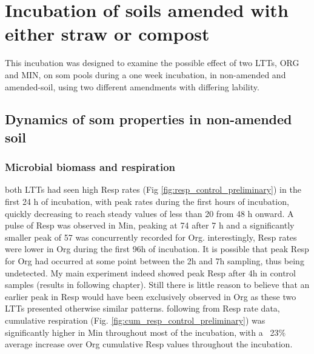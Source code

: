\documentclass[12pt]{report}
\begin{document}
		
		
		\section{Incubation of soils amended with either straw or compost}
		This incubation was designed to examine the possible effect of two LTTs, ORG and MIN, on \gls{som} pools during a one week incubation, in non-amended and amended-soil, using two different amendments with differing lability.
		
		\subsection{Dynamics of \gls{som} properties in non-amended soil}
		
		\subsubsection{Microbial biomass and respiration}
		both LTTs had seen high Resp rates (Fig \ref{fig:resp_control_preliminary}) in the first 24 h of incubation, with peak rates during the first hours of incubation, quickly decreasing to reach steady values of less than 20 \respunit from 48 h onward. A pulse of Resp was observed in Min, peaking at 74   \respunit after 7 h and a significantly smaller peak of 57 \respunit was concurrently recorded for Org. interestingly, Resp rates were lower in Org during the first 96h of incubation. It is possible that peak Resp for Org had occurred at some point between the 2h and 7h  sampling, thus being undetected. My main experiment indeed showed peak Resp after 4h in control samples (results in following chapter). Still there is little reason to believe that an earlier peak in Resp would have been exclusively observed in Org as these two LTTs presented otherwise similar patterns.
		following from Resp rate data, cumulative respiration (Fig. \ref{fig:cum_resp_control_preliminary}) was significantly higher in Min throughout most of the incubation, with a ~23$\%$ average increase over Org cumulative Resp values throughout the incubation.\\
		
\end{document}

